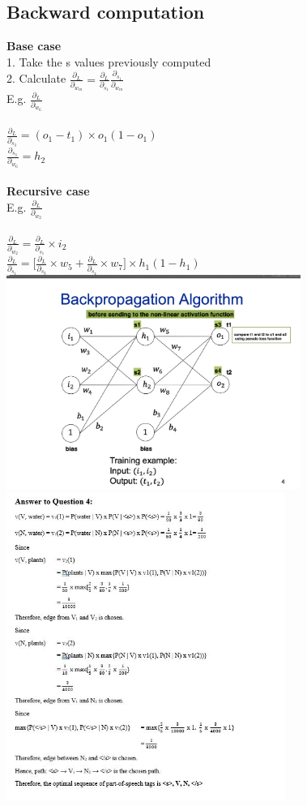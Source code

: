 \documentclass[11pt]{article}
\begin{document}
\begin{multicols*}{3}
\subsection*{Backward computation}
\textbf{Base case}\\
1. Take the s values previously computed \\
2. Calculate $\frac{\partial_{L}}{\partial_{w_{m}}} =  \frac{\partial_{L}}{\partial_{s_{1}}}\frac{\partial_{s_{1}}}{\partial_{w_{m}}}$\\
	E.g. $\frac{\partial_{L}}{\partial_{w_{6}}}$\\
	\\$\frac{\partial_{L}}{\partial_{s_{3}}}= (o_{1} - t_{1}) \times o_{1}(1 - o_{1})$\\
$\frac{\partial_{s_{3}}}{\partial_{w_{6}}} = h_{2}$\\\\
\textbf{Recursive case}\\
E.g. $\frac{\partial_{L}}{\partial_{w_{2}}}$\\
\\$\frac{\partial_{L}}{\partial_{w_{2}}}= \frac{\partial_{L}}{\partial_{s_{1}}} \times i_{2}$\\
$\frac{\partial_{L}}{\partial_{s_{1}}} = \big[\frac{\partial_{L}}{\partial_{s_{3}}} \times w_{5} + \frac{\partial_{L}}{\partial_{s_{4}}} \times w_{7} \big] \times h_{1}(1 - h_{1})$\\
\includegraphics[height=7cm]{images/b}\\
\includegraphics[height=10cm]{images/ver}\\

\end{multicols*}
\end{document}
